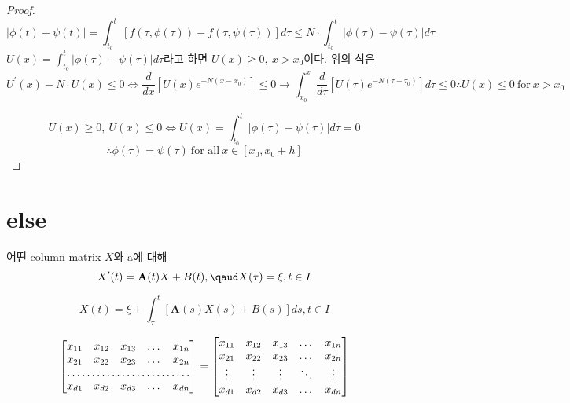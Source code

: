 \documentclass[a4paper,10pt]{article}
\begin{document}
\begin{proof}
    \begin{displaymath}
        |\phi(t) - \psi(t)| = \int_{t_0}^{t} [ f(\tau, \phi(\tau)) - f(\tau, \psi(\tau))] d \tau \leq N \cdot \int_{t_0}^{t}|\phi(\tau) - \psi(\tau)| d\tau
    \end{displaymath}
    $\displaystyle{U(x) = \int_{t_0}^{t}|\phi(\tau) - \psi(\tau)| d\tau}$라고 하면 $U(x) \geq 0, \ x > x_0$이다.
    위의 식은
    \begin{displaymath}
        U^{\prime}(x) - N\cdot U(x) \leq 0 \iff \frac{d}{dx} \left[ U(x) e^{-N(x-x_0)}\right] \leq 0 \longrightarrow \int_{x_0}^{x} \frac{d}{d \tau} \left[ U(\tau) e^{-N(\tau-\tau_0)}\right] d \tau \leq 0
        \therefore U(x) \leq 0 \ \text{for} \ x > x_0
    \end{displaymath}
     
    \begin{displaymath}
        U(x) \geq 0, \ U(x) \leq 0 \iff U(x) = \int_{t_0}^{t}|\phi(\tau) - \psi(\tau)| d\tau = 0
    \end{displaymath}
    \begin{displaymath}
        \therefore
        \phi(\tau) = \psi(\tau) \ \text{for all} \ x \in [x_0, x_0 + h]
    \end{displaymath}
    \end{proof}
    
    \section{else}
    어떤 column matrix $X$와 a에 대해 
    \begin{displaymath}
        X^{\prime}(t) = \mathbf{A}(t)X + B(t), \text{\qaud} X(\tau) = \xi, t \in I
    \end{displaymath}
    
    \begin{displaymath}
        X(t) = \xi + \int_{\tau}^{t}[\mathbf{A}(s)X(s) + B(s)] ds, t \in I
    \end{displaymath} 
    
    \[
    \begin{bmatrix}
        x_{11}       & x_{12} & x_{13} & \dots & x_{1n} \\
        x_{21}       & x_{22} & x_{23} & \dots & x_{2n} \\
        \hdotsfor{5} \\
        x_{d1}       & x_{d2} & x_{d3} & \dots & x_{dn}
    \end{bmatrix}
    =
    \begin{bmatrix}
        x_{11} & x_{12} & x_{13} & \dots  & x_{1n} \\
        x_{21} & x_{22} & x_{23} & \dots  & x_{2n} \\
        \vdots & \vdots & \vdots & \ddots & \vdots \\
        x_{d1} & x_{d2} & x_{d3} & \dots  & x_{dn}
    \end{bmatrix}
    \]
    
    
\end{document}
